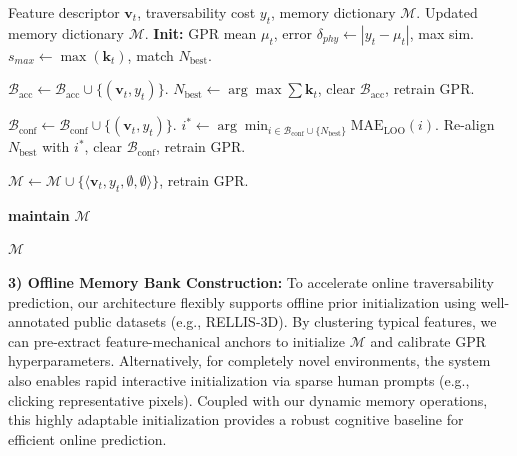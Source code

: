 \documentclass[letterpaper, 10 pt, conference]{ieeeconf}  %
\begin{document}
\begin{algorithm}[t]
\vspace*{4mm} %
\caption{Dynamic Memory Evolution Mechanism}
\label{alg:memory_evolution}
\begin{algorithmic}[1]
    \Require Feature descriptor $\mathbf{v}_t$, traversability cost $y_t$, memory dictionary $\mathcal{M}$.
    \Ensure Updated memory dictionary $\mathcal{M}$.
    \State \textbf{Init:} GPR mean $\mu_t$, error $\delta_{phy} \leftarrow |y_t - \mu_t|$, max sim. $s_{max} \leftarrow \max(\mathbf{k}_t)$, match $N_{\text{best}}$.
    
        \State $\mathcal{B}_{\text{acc}} \leftarrow \mathcal{B}_{\text{acc}} \cup \{(\mathbf{v}_t, y_t)\}$.
            \State $N_{\text{best}} \leftarrow \arg\max \sum \mathbf{k}_t$, clear $\mathcal{B}_{\text{acc}}$, retrain GPR.
        \EndIf
        
        \State $\mathcal{B}_{\text{conf}} \leftarrow \mathcal{B}_{\text{conf}} \cup \{(\mathbf{v}_t, y_t)\}$.
            \State $i^* \leftarrow \arg\min_{i \in \mathcal{B}_{\text{conf}} \cup \{N_{\text{best}}\}} \text{MAE}_{\text{LOO}}(i)$.
                \State Re-align $N_{\text{best}}$ with $i^*$, clear $\mathcal{B}_{\text{conf}}$, retrain GPR.
            \EndIf
        \EndIf
        
        \State $\mathcal{M} \leftarrow \mathcal{M} \cup \{\langle \mathbf{v}_t, y_t, \emptyset, \emptyset \rangle\}$, retrain GPR.
        
    \Else
        \State \textbf{maintain} $\mathcal{M}$
    \EndIf
    
    \State \Return $\mathcal{M}$
\end{algorithmic}
\end{algorithm}

\textbf{3) Offline Memory Bank Construction:} To accelerate online traversability prediction, our architecture flexibly supports offline prior initialization using well-annotated public datasets (e.g., RELLIS-3D). By clustering typical features, we can pre-extract feature-mechanical anchors to initialize $\mathcal{M}$ and calibrate GPR hyperparameters. Alternatively, for completely novel environments, the system also enables rapid interactive initialization via sparse human prompts (e.g., clicking representative pixels). Coupled with our dynamic memory operations, this highly adaptable initialization provides a robust cognitive baseline for efficient online prediction.
\end{document}
